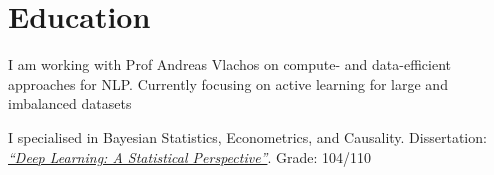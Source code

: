 \documentclass[]{cv_template}
\begin{document}
%
%

%
%

%
%

\begin{minipage}[t]{0.62\textwidth}



\section{Education}

I am working with Prof Andreas Vlachos on compute- and data-efficient approaches for NLP. Currently focusing on active learning for large and imbalanced datasets~\cite{lesci-vlachos} %

\sectionsep

I specialised in Bayesian Statistics, Econometrics, and Causality. Dissertation: \href{https://drive.google.com/file/d/1ghVGjHLF-3TWeLRvPGTQDK4CHJFv4mxt/view?usp=sharing}{\it \enquote{Deep Learning: A Statistical Perspective}}. Grade: 104/110
\sectionsep


\end{minipage}
\end{document}
